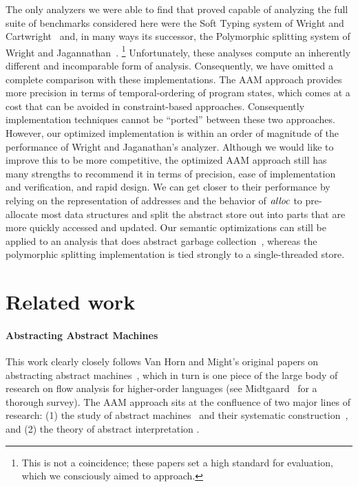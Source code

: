 \documentclass[preprint,onecolumn,9pt]{sigplanconf} %
\begin{document}
The only analyzers we were able to find that proved capable of
analyzing the full suite of benchmarks considered here were the Soft
Typing system of Wright and
Cartwright~\cite{dvanhorn:Wright1997Practical} and, in many ways its
successor, the Polymorphic splitting system of Wright and
Jagannathan~\cite{dvanhorn:wright-jagannathan-toplas98}.
%
\footnote{This is not a coincidence; these papers set a high standard for evaluation, which we consciously aimed to approach.}
%
Unfortunately, these analyses compute an inherently different and incomparable form of analysis.
%
Consequently, we have omitted a complete comparison with these implementations.
%
The AAM approach provides more precision in terms of temporal-ordering of program states, which comes at a cost that can be avoided in constraint-based approaches.
%
Consequently implementation techniques cannot be ``ported'' between these two approaches.
%
  However, our optimized implementation is within an order of magnitude of the performance of Wright and Jaganathan's analyzer.
%
Although we would like to improve this to be more competitive, the optimized AAM approach still has many strengths to recommend it in terms of precision, ease of implementation and verification, and rapid design.
%
 We can get closer to their performance by relying on the representation of addresses and the behavior of $\mathit{alloc}$ to pre-allocate most data structures and split the abstract store out into parts that are more quickly accessed and updated.
%
Our semantic optimizations can still be applied to an analysis that does abstract garbage collection~\cite{dvanhorn:Might:2006:GammaCFA}, whereas the polymorphic splitting implementation is tied strongly to a single-threaded store.

\section{Related work}
\label{sec:related}

\paragraph{Abstracting Abstract Machines}

This work clearly closely follows Van Horn and Might's original papers on abstracting abstract machines~\cite{dvanhorn:VanHorn2011Abstracting,dvanhorn:VanHorn2012Systematic}, which in turn is one piece of the large body of research on flow analysis for higher-order languages (see Midtgaard~\cite{dvanhorn:Midtgaard2011Controlflow} for a thorough survey).
%
The AAM approach sits at the confluence of two major lines of research:
%
(1) the study of abstract machines~\cite{dvanhorn:landin-64} and their systematic construction~\cite{dvanhorn:reynolds-hosc98},
%
and (2) the theory of abstract interpretation \cite{dvanhorn:Cousot:1977:AI,dvanhorn:Cousot1979Systematic}.
\end{document}
